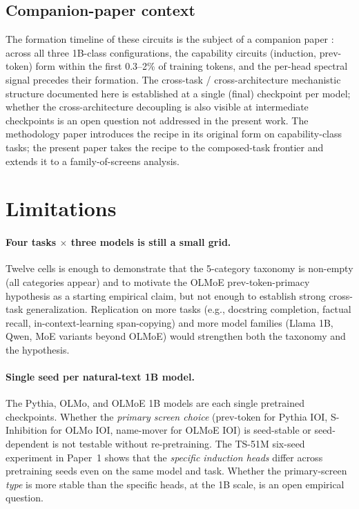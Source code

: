 \documentclass[11pt]{article}
\begin{document}
\subsection{Companion-paper context}

The formation timeline of these circuits is the subject of a companion paper \citep{paper2_developmental}: across all three 1B-class configurations, the capability circuits (induction, prev-token) form within the first 0.3--2\% of training tokens, and the per-head spectral signal precedes their formation. The cross-task / cross-architecture mechanistic structure documented here is established at a single (final) checkpoint per model; whether the cross-architecture decoupling is also visible at intermediate checkpoints is an open question not addressed in the present work. The methodology paper \citep{paper1_methodology} introduces the recipe in its original form on capability-class tasks; the present paper takes the recipe to the composed-task frontier and extends it to a family-of-screens analysis.

\section{Limitations}
\label{sec:limitations}

\paragraph{Four tasks $\times$ three models is still a small grid.}
Twelve cells is enough to demonstrate that the 5-category taxonomy is non-empty (all categories appear) and to motivate the OLMoE prev-token-primacy hypothesis as a starting empirical claim, but not enough to establish strong cross-task generalization. Replication on more tasks (e.g., docstring completion, factual recall, in-context-learning span-copying) and more model families (Llama 1B, Qwen, MoE variants beyond OLMoE) would strengthen both the taxonomy and the hypothesis.

\paragraph{Single seed per natural-text 1B model.}
The Pythia, OLMo, and OLMoE 1B models are each single pretrained checkpoints. Whether the \emph{primary screen choice} (prev-token for Pythia IOI, S-Inhibition for OLMo IOI, name-mover for OLMoE IOI) is seed-stable or seed-dependent is not testable without re-pretraining. The TS-51M six-seed experiment in Paper~1 shows that the \emph{specific induction heads} differ across pretraining seeds even on the same model and task. Whether the primary-screen \emph{type} is more stable than the specific heads, at the 1B scale, is an open empirical question.
\end{document}
